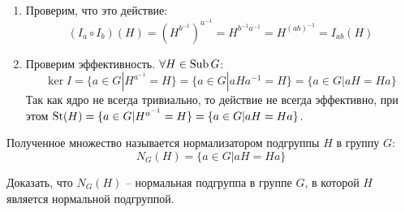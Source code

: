\begin{enumerate}
    \item Проверим, что это действие: $$(I_a \circ I_b)(H) = (H^{b^{-1}})^{a^{-1}} = H^{b^{-1}a^{-1}} = H^{(ab)^{-1}} = I_{ab}(H)$$
    \item Проверим эффективность. $\forall H \in \operatorname{Sub} G$:
    $$\ker I = \{ a \in G | H^{a^{-1}} = H \} = \{ a \in G | aHa^{-1} = H \} = \{ a \in G | aH = Ha \}$$
    Так как ядро не всегда тривиально, то действие не всегда эффективно, при этом $\operatorname{\text{St}}(H) = \{ a \in G | H^{a^{-1}} = H \} = \{ a \in G | aH = Ha \}$.
\end{enumerate}

\begin{definition}
    Полученное множество называется нормализатором подгруппы $H$ в группу $G$:
    $$N_G(H) = \{ a \in G | aH = Ha \}$$
\end{definition}

\begin{exercise}
    Доказать, что $N_G(H)$ -- нормальная подгруппа в группе $G$, в которой $H$ является нормальной подгруппой.
\end{exercise}